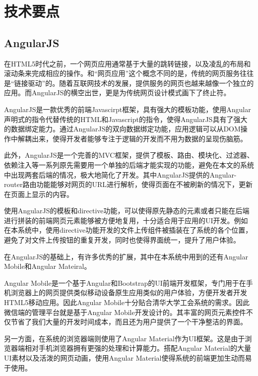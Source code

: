 
\chapter{技术要点}

\section{AngularJS}

\label{angularJS}

在HTML5时代之前，一个网页应用通常基于大量的跳转链接，以及凌乱的布局和滚动条来完成相应的操作。和“网页应用”这个概念不同的是，传统的网页服务往往是“链接驱动”的。随着互联网技术的发展，提供服务的网页也越来越像一个独立的应用。而AngularJS的横空出世，更是为传统网页设计模式画下了终止符。

AngularJS是一款优秀的前端Javascirpt框架，具有强大的模板功能，使用Angular声明式的指令代替传统的HTML和Javascript的指令，使得AngularJS具有了强大的数据绑定能力。通过AngularJS的双向数据绑定功能，应用逻辑可以从DOM操作中解耦出来，使得开发者能够专注于逻辑的开发而不用为数据的呈现伤脑筋。

此外，AngularJS是一个完善的MVC框架，提供了模板、路由、模块化、过滤器、依赖注入等一系列原先需要用一个单独的后端才能实现的功能，避免在本文的系统中出现两套后端的情况，极大地简化了开发。其中AngularJS提供的Angular-router路由功能能够对网页的URL进行解析，使得页面在不被刷新的情况下，更新在页面上显示的内容。

使用AngularJS的模板和directive功能，可以使得原先静态的元素或者只能在后端进行拼装的前端网页元素能够被方便地复用，十分适合用于应用的UI开发。例如在本系统中，使用directive功能开发的文件上传组件被插装在了系统的各个位置，避免了对文件上传按钮的重复开发，同时也使得界面统一，提升了用户体验。

在AngularJS的基础上，有许多优秀的扩展，其中在本系统中用到的还有Angular Mobile和Angular Mateiral。

Angular Mobile是一个基于Angular和Bootstrap的UI前端开发框架，专门用于在手机浏览器上的网页提供类似移动设备原生应用类似的用户体验，方便开发者开发HTML5移动应用。因此Angular Mobile十分贴合清华大学工会系统的需求。因此微信端的管理平台就是基于Angular Mobile开发设计的。其丰富的网页元素控件不仅节省了我们大量的开发时间成本，而且还为用户提供了一个干净整洁的界面。

另一方面，在系统的浏览器端则使用了Angular Material作为UI框架。这是由于浏览器端相对手机浏览器拥有更强的处理和计算能力。搭配Angular Material的大量UI素材以及活泼的网页动画，使用Angular Material使得系统的前端更加生动而易于使用。

